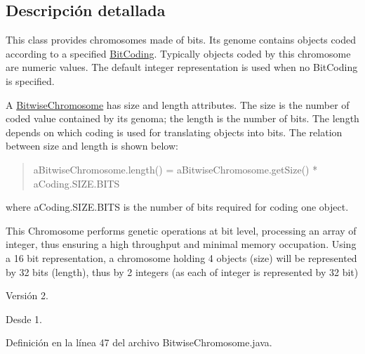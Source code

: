 \subsection{Descripción detallada}
This class provides chromosomes made of bits. Its genome contains objects coded according to a specified \hyperlink{}{Bit\-Coding}. Typically objects coded by this chromosome are numeric values. The default integer representation is used when no Bit\-Coding is specified. 

A \hyperlink{classjenes_1_1chromosome_1_1_bitwise_chromosome}{Bitwise\-Chromosome} has size and length attributes. The size is the number of coded value contained by its genoma; the length is the number of bits. The length depends on which coding is used for translating objects into bits. The relation between size and length is shown below\-: 

\begin{quotation}

\begin{DoxyPre}
 aBitwiseChromosome.length() = aBitwiseChromosome.getSize() *  aCoding.SIZE.BITS
\end{DoxyPre}
\end{quotation}
where a\-Coding.\-S\-I\-Z\-E.\-B\-I\-T\-S is the number of bits required for coding one object. 

This Chromosome performs genetic operations at bit level, processing an array of integer, thus ensuring a high throughput and minimal memory occupation. Using a 16 bit representation, a chromosome holding 4 objects (size) will be represented by 32 bits (length), thus by 2 integers (as each of integer is represented by 32 bit)

\begin{DoxyVersion}{Versión}
2. 
\end{DoxyVersion}
\begin{DoxySince}{Desde}
1. 
\end{DoxySince}


Definición en la línea 47 del archivo Bitwise\-Chromosome.\-java.



